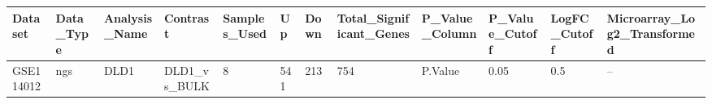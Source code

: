 \begingroup
\tiny
\setlength{\tabcolsep}{2pt}
\renewcommand{\arraystretch}{1.18}
\begin{tabular}{@{}llllllllllll@{}}
\toprule
Dataset & Data\_Type & Analysis\_Name & Contrast & Samples\_Used & Up & Down & Total\_Significant\_Genes & P\_Value\_Column & P\_Value\_Cutoff & LogFC\_Cutoff & Microarray\_Log2\_Transformed \\
\midrule
GSE114012 & ngs & DLD1 & DLD1\_vs\_BULK & 8 & 541 & 213 & 754 & P.Value & 0.05 & 0.5 & -- \\
\bottomrule
\end{tabular}
\endgroup

